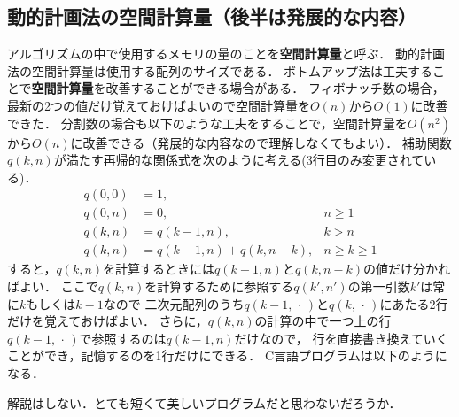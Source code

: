 \documentclass[a4paper,twoside,onecolumn,openany,article]{memoir}
\theoremstyle{remark}
\begin{document}
\subsection{動的計画法の空間計算量（後半は発展的な内容）}\label{sec:space}
アルゴリズムの中で使用するメモリの量のことを\textbf{空間計算量}と呼ぶ．
動的計画法の空間計算量は使用する配列のサイズである．
ボトムアップ法は工夫することで\textbf{空間計算量}を改善することができる場合がある．
フィボナッチ数の場合，最新の2つの値だけ覚えておけばよいので空間計算量を$O(n)$から$O(1)$に改善できた．
分割数の場合も以下のような工夫をすることで，空間計算量を$O(n^2)$から$O(n)$に改善できる（発展的な内容なので理解しなくてもよい）．
補助関数$q(k,n)$が満たす再帰的な関係式を次のように考える(3行目のみ変更されている)．
\begin{align*}
q(0,0) &= 1,\\
q(0,n) &= 0,& n \ge 1\\
q(k,n) &= q(k-1,n),& k > n\\
q(k,n) &= q(k-1,n) + q(k, n-k),& n\ge k\ge 1
\end{align*}
すると，$q(k,n)$を計算するときには$q(k-1,n)$と$q(k,n-k)$の値だけ分かればよい．
ここで$q(k,n)$を計算するために参照する$q(k',n')$の第一引数$k'$は常に$k$もしくは$k-1$なので
二次元配列のうち$q(k-1,\,\cdot\,)$と$q(k,\,\cdot\,)$にあたる2行だけを覚えておけばよい．
さらに，$q(k,n)$の計算の中で一つ上の行$q(k-1,\,\cdot\,)$で参照するのは$q(k-1,n)$だけなので，
行を直接書き換えていくことができ，記憶するのを1行だけにできる．
C言語プログラムは以下のようになる．

解説はしない．とても短くて美しいプログラムだと思わないだろうか．

\end{document}
